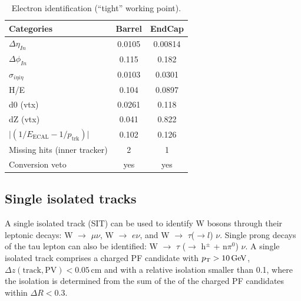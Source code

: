 \begin{table}[h!]
  \caption{Electron identification (``tight'' working point).\label{tab:ele-id}}
  \centering
  \footnotesize
  \begin{tabular}{ lcc }
    \hline
    \hline
    Categories                                               & Barrel    & EndCap    \\
    \hline
    $\Delta \eta_{In}$                                       & 0.0105   & 0.00814  \\
    $\Delta \phi_{In}$                                       & 0.115    & 0.182  \\
    $\sigma_{i\eta i\eta}$                                   & 0.0103    & 0.0301  \\
    H/E                                                      & 0.104    & 0.0897   \\
    d0 (vtx)                                                 & 0.0261    & 0.118  \\
    dZ (vtx)                                                 & 0.041    & 0.822  \\
    $\lvert(1/E_{\textrm{ECAL}} - 1/p_{\textrm{trk}})\rvert$ & 0.102     & 0.126  \\
    Missing hits (inner tracker)                             & 2         & 1         \\
    Conversion veto                                          & yes       & yes   \\
    \hline
    \hline
  \end{tabular}
  \end{table}


\subsection{Single isolated tracks}
\label{sec:SIT}
A single isolated track (SIT) can be used to identify W bosons through their leptonic decays: 
W $\rightarrow$ $\mu \nu$, W $\rightarrow$ $e\nu$, and W $\rightarrow$ $\tau$($\rightarrow l$) $\nu$. 
Single prong decays of the tau lepton can also be identified: W $\rightarrow$ $\tau$ ($\rightarrow$ h$^{\pm}$ + n$\pi^{0}$) $\nu$. 
A single isolated track comprises a charged PF candidate with ${p_{\text T}} > 10 \mathrm{\,Ge\kern -0.1em V}$, $\Delta z(\mathrm{track}, \mathrm{PV}) < 0.05 \, \mathrm{cm}$ 
and with a relative isolation smaller than 0.1, where the isolation is determined from the sum 
of the \Pt of the charged PF candidates within $\Delta R < 0.3$.


